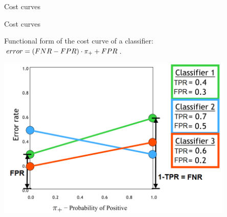 \begin{vbframe}{Cost curves}

\end{vbframe}


\begin{vbframe}{Cost curves}


Functional form of the cost curve of a classifier: 
$error = (FNR - FPR) \cdot \pi_{+} + FPR$.

\begin{center}
  \includegraphics[width=0.85\textwidth]{figure_man/cost-curves-3.png}
\end{center}

\end{vbframe}


